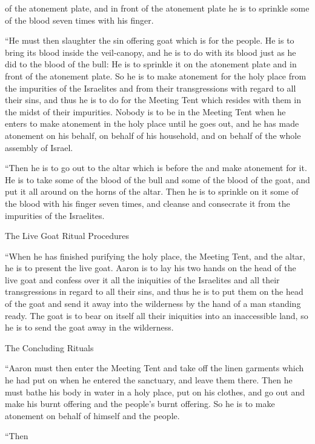 {of the atonement plate,
and in front
of the atonement plate
he is to sprinkle
some
of the blood
seven
times
with his finger.
\par }{\PP {}“He must then slaughter
the
sin offering
goat
which
is for the people.
He is to bring
its blood
inside the veil-canopy,
and he is to do
with
its blood
just
as he did
to the blood
of the bull: He is to sprinkle
it on
the atonement plate
and in front
of the atonement plate.
So he is to make atonement
for the holy
place from the impurities
of the Israelites
and from their transgressions
with regard to all
their sins,
and thus
he is to do
for the Meeting
Tent
which resides
with
them in the midst
of their impurities.
Nobody
is to be
in the Meeting
Tent
when he enters
to make atonement
in the holy place
until
he goes out,
and he has made atonement
on
his behalf,
on behalf
of his household,
and on behalf
of the whole
assembly
of Israel.
\par }{\PP {}“Then he is to
go out
to
the altar
which
is before
the
{}
and make atonement
for it.
He is to take
some of the blood
of the bull
and some of the blood
of the goat,
and put
it all around
on
the horns
of the altar.
Then he is to sprinkle
on
it some
of the blood
with his finger
seven
times,
and cleanse
and consecrate
it from the impurities
of the Israelites.
\par }{\SH The Live Goat Ritual Procedures
\par }{\PP {}“When he has finished
purifying
the holy
place, the Meeting
Tent,
and the altar,
he is to present
the live
goat.
Aaron
is to lay
his two
hands
on
the head
of the live
goat
and confess
over
it all
the iniquities
of the Israelites
and all
their transgressions
in regard to all
their sins,
and thus he is to put
them on
the head
of the goat
and send
it away into the wilderness
by the hand
of a man
standing ready.
The goat
is to bear
on
itself all
their iniquities
into
an inaccessible
land,
so he is to send
the goat
away in the wilderness.
\par }{\SH The Concluding Rituals
\par }{\PP {}“Aaron
must then enter
the Meeting
Tent
and take off
the linen
garments
which
he had put on
when he entered
the sanctuary,
and leave
them there.
Then he must bathe
his body
in water
in a holy
place,
put on
his clothes,
and go out
and make
his burnt offering
and the
people’s
burnt offering.
So he is to make atonement
on behalf
of himself and the people.
\par }{\PP {}“Then
}
